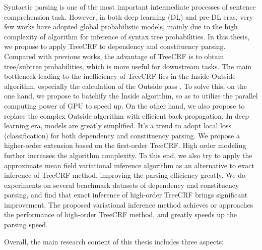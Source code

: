 
\begin{eabstract}
  Syntactic parsing is one of the most important intermediate processes of sentence comprehension task.
  However, in both deep learning (DL) and pre-DL eras, very few works have adopted global probabilistic models, mainly due to the high complexity of algorithm for inference of syntax tree probabilities.
  In this thesis, we propose to apply TreeCRF to dependency and constituency parsing.
  Compared with previous works, the advantage of TreeCRF is to obtain tree/subtree probabilities, which is more useful for downstream tasks.
  The main bottleneck leading to the inefficiency of TreeCRF lies in the Inside-Outside algorithm, especially the calculation of the Outside pass .
  To solve this, on the one hand, we propose to batchify the Inside algorithm, so as to utilize the parallel computing power of GPU to speed up.
  On the other hand, we also propose to replace the complex Outside algorithm with efficient back-propagation.
  In deep learning era, models are greatly simplified. It's a trend to adopt local loss (classification) for both dependency and constituency parsing.
  We propose a higher-order extension based on the first-order TreeCRF.
  High order modeling further increases the algorithm complexity.
  To this end, we also try to apply the approximate mean field variational inference algorithm as an alternative to exact inference of TreeCRF method, improving the parsing efficiency greatly.
  We do experiments on several benchmark datasets of dependency and constituency parsing, and find that exact inference of high-order TreeCRF brings significant improvement.
  The proposed variational inference method achieves or approaches the performance of high-order TreeCRF method, and greatly speeds up the parsing speed.

  Overall, the main research content of this thesis includes three aspects:


\end{eabstract}
